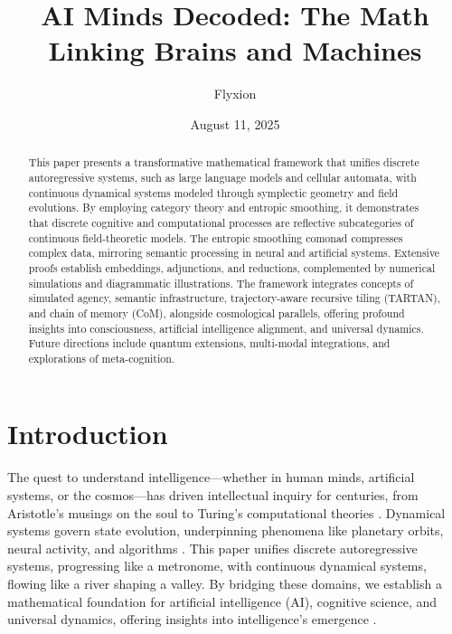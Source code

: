 \documentclass[a4paper,12pt]{article}
\title{AI Minds Decoded: The Math Linking Brains and Machines}
\author{Flyxion}
\date{August 11, 2025}
\theoremstyle{definition}
\begin{document}
\maketitle

\begin{abstract}
This paper presents a transformative mathematical framework that unifies discrete autoregressive systems, such as large language models and cellular automata, with continuous dynamical systems modeled through symplectic geometry and field evolutions. By employing category theory and entropic smoothing, it demonstrates that discrete cognitive and computational processes are reflective subcategories of continuous field-theoretic models. The entropic smoothing comonad compresses complex data, mirroring semantic processing in neural and artificial systems. Extensive proofs establish embeddings, adjunctions, and reductions, complemented by numerical simulations and diagrammatic illustrations. The framework integrates concepts of simulated agency, semantic infrastructure, trajectory-aware recursive tiling (TARTAN), and chain of memory (CoM), alongside cosmological parallels, offering profound insights into consciousness, artificial intelligence alignment, and universal dynamics. Future directions include quantum extensions, multi-modal integrations, and explorations of meta-cognition.
\end{abstract}

\newpage
\tableofcontents
\newpage

\section{Introduction}
\label{sec:intro}

The quest to understand intelligence—whether in human minds, artificial systems, or the cosmos—has driven intellectual inquiry for centuries, from Aristotle’s musings on the soul to Turing’s computational theories \cite{Turing1950, Searle1980}. Dynamical systems govern state evolution, underpinning phenomena like planetary orbits, neural activity, and algorithms \cite{Arnold1989, Carroll2019}. This paper unifies discrete autoregressive systems, progressing like a metronome, with continuous dynamical systems, flowing like a river shaping a valley. By bridging these domains, we establish a mathematical foundation for artificial intelligence (AI), cognitive science, and universal dynamics, offering insights into intelligence’s emergence \cite{Baars1988, Chalmers1996, Dennett1991, Koch2019, Dehaene2014}.
\end{document}
